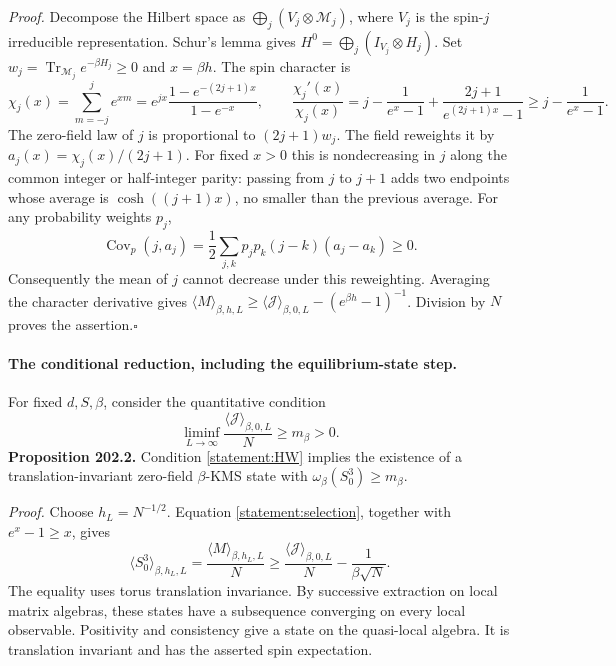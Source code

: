 \documentclass[11pt]{article}
\begin{document}
	\emph{Proof.}
	Decompose the Hilbert space as
	$\bigoplus_j(V_j\otimes\mathcal M_j)$, where $V_j$ is the spin-$j$
	irreducible representation. Schur's lemma gives
	$H^0=\bigoplus_j(I_{V_j}\otimes H_j)$. Set
	$w_j=\operatorname{Tr}_{\mathcal M_j}e^{-\beta H_j}\geq0$ and $x=\beta h$.
	The spin character is
	\[
	\chi_j(x)=\sum_{m=-j}^j e^{xm}
	=e^{jx}\frac{1-e^{-(2j+1)x}}{1-e^{-x}},
	\qquad
	\frac{\chi_j'(x)}{\chi_j(x)}
	=j-\frac1{e^x-1}+\frac{2j+1}{e^{(2j+1)x}-1}
	\geq j-\frac1{e^x-1}.
	\]
	The zero-field law of $j$ is proportional to $(2j+1)w_j$. The field
	reweights it by $a_j(x)=\chi_j(x)/(2j+1)$. For fixed $x>0$ this is
	nondecreasing in $j$ along the common integer or half-integer parity:
	passing from $j$ to $j+1$ adds two endpoints whose average is
	$\cosh((j+1)x)$, no smaller than the previous average. For any probability
	weights $p_j$,
	\[
	\operatorname{Cov}_p(j,a_j)
	=\frac12\sum_{j,k}p_jp_k(j-k)(a_j-a_k)\geq0.
	\]
	Consequently the mean of $j$ cannot decrease under this reweighting.
	Averaging the character derivative gives
	$\langle M\rangle_{\beta,h,L}\geq
	\langle\mathcal J\rangle_{\beta,0,L}-(e^{\beta h}-1)^{-1}$.
	Division by $N$ proves the assertion.\hfill$\square$
	
	\paragraph{The conditional reduction, including the equilibrium-state step.}
	For fixed $d,S,\beta$, consider the quantitative condition
	\begin{equation}\label{statement:HW}
		\liminf_{L\to\infty}
		\frac{\langle\mathcal J\rangle_{\beta,0,L}}{N}
		\geq m_\beta>0. \tag{HW}
	\end{equation}
	\textbf{Proposition 202.2.} Condition \eqref{statement:HW} implies the
	existence of a translation-invariant zero-field $\beta$-KMS state with
	$\omega_\beta(S_0^3)\geq m_\beta$.
	
	\emph{Proof.}
	Choose $h_L=N^{-1/2}$. Equation \eqref{statement:selection}, together with
	$e^x-1\geq x$, gives
	\[
	\langle S_0^3\rangle_{\beta,h_L,L}
	=\frac{\langle M\rangle_{\beta,h_L,L}}{N}
	\geq\frac{\langle\mathcal J\rangle_{\beta,0,L}}{N}
	-\frac1{\beta\sqrt N}.
	\]
	The equality uses torus translation invariance. By successive extraction
	on local matrix algebras, these states have a subsequence converging on
	every local observable. Positivity and consistency give a state on the
	quasi-local algebra. It is translation invariant and has the asserted
	spin expectation.
	
\end{document}
